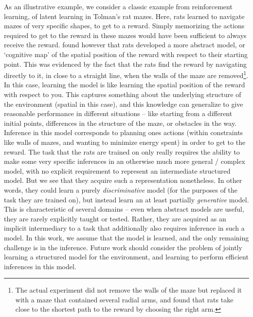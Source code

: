 As an illustrative example, we consider a classic example from reinforcement learning, of latent learning in Tolman's rat mazes\citep{tolman1948cognitive}. Here, rats learned to navigate mazes of very specific shapes, to get to a reward. Simply memorizing the actions required to get to the reward in these mazes would have been sufficient to always receive the reward. \citet{tolman1948cognitive} found however that rats developed a more abstract model, or `cognitive map' of the spatial position of the reward with respect to their starting point. This was evidenced by the fact that the rats find the reward by navigating directly to it, in close to a straight line, when the walls of the maze are removed\footnote{The actual experiment did not remove the walls of the maze but replaced it with a maze that contained several radial arms, and found that rats take close to the shortest path to the reward by choosing the right arm.}. In this case, learning the model is like learning the spatial position of the reward with respect to you. This captures something about the underlying structure of the environment (spatial in this case), and this knowledge can generalize to give reasonable performance in different situations -- like starting from a different initial points, differences in the structure of the maze, or obstacles in the way. Inference in this model corresponds to planning ones actions (within constraints like walls of mazes, and wanting to minimize energy spent) in order to get to the reward. The task that the rats are trained on only really requires the ability to make some very specific inferences in an otherwise much more general / complex model, with no explicit requirement to represent an intermediate structured model. But we see that they acquire such a representation nonetheless. In other words, they could learn a purely \textit{discriminative} model (for the purposes of the task they are trained on), but instead learn an at least partially \textit{generative} model. This is characteristic of several domains -- even when abstract models are useful, they are rarely explicitly taught or tested. Rather, they are acquired as an implicit intermediary to a task that additionally also requires inference in such a model. In this work, we assume that the model is learned, and the only remaining challenge is in the inference. Future work should consider the problem of jointly learning a structured model for the environment, and learning to perform efficient inferences in this model.


